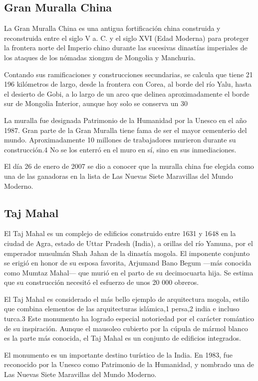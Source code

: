 \documentclass[a4paper,12pt]{article}
\begin{document}
 \subsection{Gran Muralla China}  
La Gran Muralla China es una antigua fortificación china construida y reconstruida entre el siglo V a. C. y el siglo XVI (Edad Moderna) para proteger la frontera norte del Imperio chino durante las sucesivas dinastías imperiales de los ataques de los nómadas xiongnu de Mongolia y Manchuria.

Contando sus ramificaciones y construcciones secundarias, se calcula que tiene 21 196 kilómetros de largo, desde la frontera con Corea, al borde del río Yalu, hasta el desierto de Gobi, a lo largo de un arco que delinea aproximadamente el borde sur de Mongolia Interior, aunque hoy solo se conserva un 30%

La muralla fue designada Patrimonio de la Humanidad por la Unesco en el año 1987. Gran parte de la Gran Muralla tiene fama de ser el mayor cementerio del mundo. Aproximadamente 10 millones de trabajadores murieron durante su construcción.4 No se los enterró en el muro en sí, sino en sus inmediaciones.

El día 26 de enero de 2007 se dio a conocer que la muralla china fue elegida como una de las ganadoras en la lista de Las Nuevas Siete Maravillas del Mundo Moderno.
 \subsection{Taj Mahal} 
 El Taj Mahal es un complejo de edificios construido entre 1631 y 1648 en la ciudad de Agra, estado de Uttar Pradesh (India), a orillas del río Yamuna, por el emperador musulmán Shah Jahan de la dinastía mogola. El imponente conjunto se erigió en honor de su esposa favorita, Arjumand Bano Begum —más conocida como Mumtaz Mahal— que murió en el parto de su decimocuarta hija. Se estima que su construcción necesitó el esfuerzo de unos 20 000 obreros.

El Taj Mahal es considerado el más bello ejemplo de arquitectura mogola, estilo que combina elementos de las arquitecturas islámica,1 persa,2 india e incluso turca.3 Este monumento ha logrado especial notoriedad por el carácter romántico de su inspiración. Aunque el mausoleo cubierto por la cúpula de mármol blanco es la parte más conocida, el Taj Mahal es un conjunto de edificios integrados.

El monumento es un importante destino turístico de la India. En 1983, fue reconocido por la Unesco como Patrimonio de la Humanidad, y nombrado una de Las Nuevas Siete Maravillas del Mundo Moderno.
\end{document}

